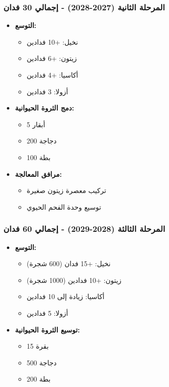\subsubsection{المرحلة الثانية (2027-2028) - إجمالي 30 فدان}
\begin{itemize}
    \item \textbf{التوسع:}
    \begin{itemize}
        \item نخيل: +10 فدادين
        \item زيتون: +6 فدادين
        \item أكاسيا: +4 فدادين
        \item أزولا: 3 فدادين
    \end{itemize}
    
    \item \textbf{دمج الثروة الحيوانية:}
    \begin{itemize}
        \item 5 أبقار
        \item 200 دجاجة
        \item 100 بطة
    \end{itemize}
    
    \item \textbf{مرافق المعالجة:}
    \begin{itemize}
        \item تركيب معصرة زيتون صغيرة
        \item توسيع وحدة الفحم الحيوي
    \end{itemize}
\end{itemize}

\subsubsection{المرحلة الثالثة (2028-2029) - إجمالي 60 فدان}
\begin{itemize}
    \item \textbf{التوسع:}
    \begin{itemize}
        \item نخيل: +15 فدان (600 شجرة)
        \item زيتون: +10 فدادين (1000 شجرة)
        \item أكاسيا: زيادة إلى 10 فدادين
        \item أزولا: 5 فدادين
    \end{itemize}
    
    \item \textbf{توسيع الثروة الحيوانية:}
    \begin{itemize}
        \item 15 بقرة
        \item 500 دجاجة
        \item 200 بطة
    \end{itemize}
\end{itemize}

